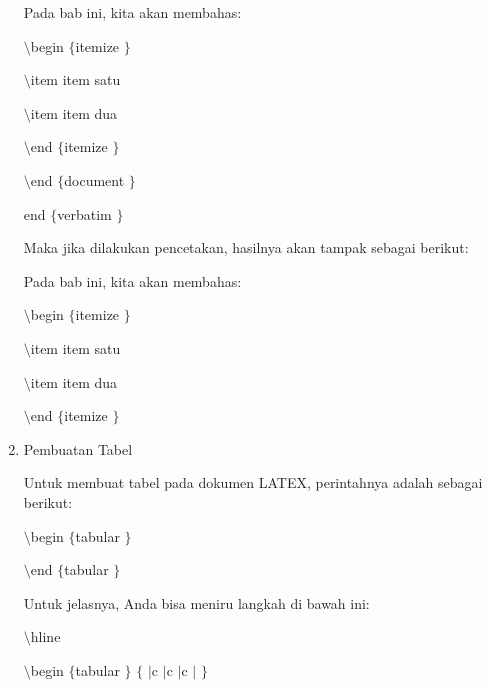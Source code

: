 \begin{enumerate}
{\fontsize{10pt}{10pt}\selectfont Pada bab ini, kita akan membahas:} \par
{\fontsize{10pt}{10pt}\selectfont  $  \setminus  $begin $  \{  $itemize $  \}  $} \par
{\fontsize{10pt}{10pt}\selectfont  $  \setminus  $item item satu} \par
{\fontsize{10pt}{10pt}\selectfont  $  \setminus  $item item dua} \par
{\fontsize{10pt}{10pt}\selectfont  $  \setminus  $end $  \{  $itemize $  \}  $} \par
{\fontsize{10pt}{10pt}\selectfont  $  \setminus  $end $  \{  $document $  \}  $} \par
{\fontsize{10pt}{10pt}\selectfont end $  \{  $verbatim $  \}  $} \par
\vspace{10pt}
{\fontsize{10pt}{10pt}\selectfont Maka jika dilakukan pencetakan, hasilnya akan tampak sebagai berikut:} \par
{\fontsize{10pt}{10pt}\selectfont Pada bab ini, kita akan membahas:} \par
{\fontsize{10pt}{10pt}\selectfont  $  \setminus  $begin $  \{  $itemize $  \}  $} \par
{\fontsize{10pt}{10pt}\selectfont  $  \setminus  $item item satu} \par
{\fontsize{10pt}{10pt}\selectfont  $  \setminus  $item item dua} \par
{\fontsize{10pt}{10pt}\selectfont  $  \setminus  $end $  \{  $itemize $  \}  $} \par
\vspace{10pt}
\noindent 
\item Pembuatan Tabel \par
 Untuk membuat tabel pada dokumen LATEX, perintahnya adalah sebagai berikut: \par
{\fontsize{10pt}{10pt}\selectfont  $  \setminus  $begin $  \{  $tabular $  \}  $} \par
{\fontsize{10pt}{10pt}\selectfont  $  \setminus  $end $  \{  $tabular $  \}  $} \par
\vspace{12pt}
Untuk jelasnya, Anda bisa meniru langkah di bawah ini: \par
{\fontsize{10pt}{10pt}\selectfont  $  \setminus  $hline} \par
{\fontsize{10pt}{10pt}\selectfont  $  \setminus  $begin $  \{  $tabular $  \}  $ $  \{  $ $  \vert  $c $  \vert  $c $  \vert  $c $  \vert  $ $  \}  $} \par

\end{enumerate}
